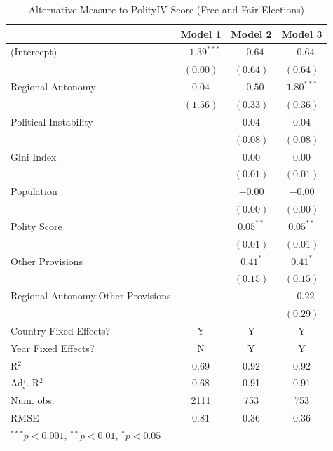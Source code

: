 \documentclass[12pt]{article}
\begin{document}
\begin{table}[!htbp]
	\begin{center}
		\begin{tabular}{l c c c }
			\hline
			& Model 1 & Model 2 & Model 3 \\
			\hline
			(Intercept)                  & $-1.39^{***}$ & $-0.64$     & $-0.64$      \\
			& $(0.00)$      & $(0.64)$    & $(0.64)$     \\
			Regional Autonomy                   & $0.04$        & $-0.50$     & $1.80^{***}$ \\
			& $(1.56)$      & $(0.33)$    & $(0.36)$     \\
			Political Instability               &               & $0.04$      & $0.04$       \\
			&               & $(0.08)$    & $(0.08)$     \\
			Gini Index              &               & $0.00$      & $0.00$       \\
			&               & $(0.01)$    & $(0.01)$     \\
			Population               &               & $-0.00$     & $-0.00$      \\
			&               & $(0.00)$    & $(0.00)$     \\
			Polity Score       &               & $0.05^{**}$ & $0.05^{**}$  \\
			&               & $(0.01)$    & $(0.01)$     \\
			Other Provisions            &               & $0.41^{*}$  & $0.41^{*}$   \\
			&               & $(0.15)$    & $(0.15)$     \\
			Regional Autonomy:Other Provisions &               &             & $-0.22$      \\
			&               &             & $(0.29)$     \\
			\hline
			Country Fixed Effects?		 & Y			 & Y 		   & Y			  \\
			Year Fixed Effects?			 & N			 & Y		   & Y			  \\
			R$^2$                        & 0.69          & 0.92        & 0.92         \\
			Adj. R$^2$                   & 0.68          & 0.91        & 0.91         \\
			Num. obs.                    & 2111          & 753         & 753          \\
			RMSE                         & 0.81          & 0.36        & 0.36         \\
			\hline
			\multicolumn{4}{l}{\scriptsize{$^{***}p<0.001$, $^{**}p<0.01$, $^*p<0.05$}}
		\end{tabular}
		\caption{Alternative Measure to PolityIV Score (Free and Fair Elections)}
		\label{table:coefficients}
	\end{center}
\end{table}
\end{document}

